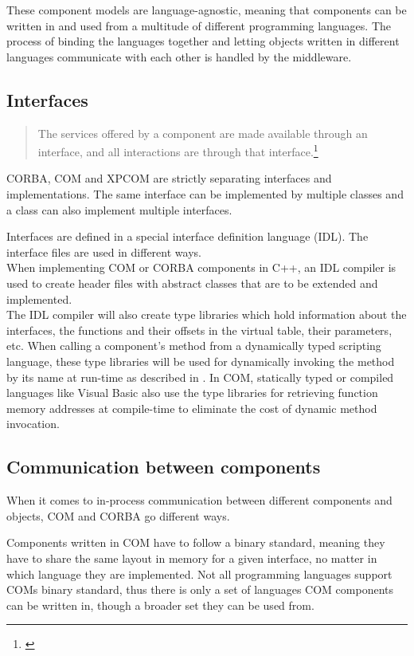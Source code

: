 These component models are language-agnostic, meaning that components can be written in and used from a multitude of different programming languages. The process of binding the languages together and letting objects written in different languages communicate with each other is handled by the middleware.

\subsection{Interfaces}

\begin{quotation}
The services offered by a component are made available through an interface, and all interactions are through that interface.\footnote{\citep[444]{Sommerville}}
\end{quotation}

CORBA, COM and XPCOM are strictly separating interfaces and implementations. The same interface can be implemented by multiple classes and a class can also implement multiple interfaces.

Interfaces are defined in a special interface definition language (IDL). The interface files are used in different ways.\\
When implementing COM or CORBA components in C++, an IDL compiler is used to create header files with abstract classes that are to be extended and implemented.\\
The IDL compiler will also create type libraries which hold information about the interfaces, the functions and their offsets in the virtual table, their parameters, etc. When calling a component's method from a dynamically typed scripting language, these type libraries will be used for dynamically invoking the method by its name at run-time as described in . In COM, statically typed or compiled languages like Visual Basic also use the type libraries for retrieving function memory addresses at compile-time to eliminate the cost of dynamic method invocation.  

\subsection{Communication between components}

When it comes to in-process communication between different components and objects, COM and CORBA go different ways. 

Components written in COM have to follow a binary standard, meaning they have to share the same layout in memory for a given interface, no matter in which language they are implemented. Not all programming languages support COMs binary standard, thus there is only a set of languages COM components can be written in, though a broader set they can be used from.

